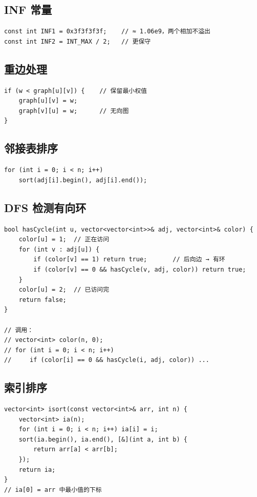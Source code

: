 \documentclass[12pt,a4paper]{article}
\begin{document}
\subsection{INF 常量}

\begin{lstlisting}
const int INF1 = 0x3f3f3f3f;    // ≈ 1.06e9，两个相加不溢出
const int INF2 = INT_MAX / 2;   // 更保守
\end{lstlisting}

\subsection{重边处理}

\begin{lstlisting}
if (w < graph[u][v]) {    // 保留最小权值
    graph[u][v] = w;
    graph[v][u] = w;      // 无向图
}
\end{lstlisting}

\subsection{邻接表排序}

\begin{lstlisting}
for (int i = 0; i < n; i++)
    sort(adj[i].begin(), adj[i].end());
\end{lstlisting}

\subsection{DFS 检测有向环}

\begin{lstlisting}[caption={三色标记法}]
bool hasCycle(int u, vector<vector<int>>& adj, vector<int>& color) {
    color[u] = 1;  // 正在访问
    for (int v : adj[u]) {
        if (color[v] == 1) return true;       // 后向边 → 有环
        if (color[v] == 0 && hasCycle(v, adj, color)) return true;
    }
    color[u] = 2;  // 已访问完
    return false;
}

// 调用：
// vector<int> color(n, 0);
// for (int i = 0; i < n; i++)
//     if (color[i] == 0 && hasCycle(i, adj, color)) ...
\end{lstlisting}

\subsection{索引排序}

\begin{lstlisting}[caption={按值排序返回原下标}]
vector<int> isort(const vector<int>& arr, int n) {
    vector<int> ia(n);
    for (int i = 0; i < n; i++) ia[i] = i;
    sort(ia.begin(), ia.end(), [&](int a, int b) {
        return arr[a] < arr[b];
    });
    return ia;
}
// ia[0] = arr 中最小值的下标
\end{lstlisting}
\end{document}

